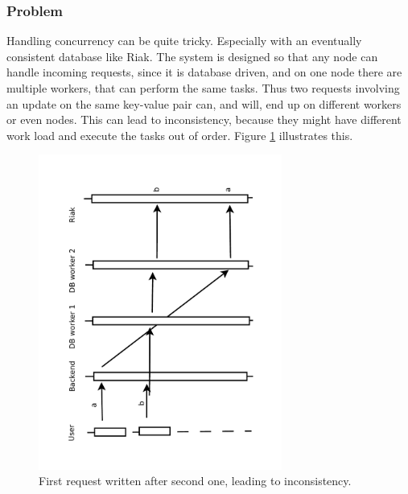 \documentclass[11pt,a4paper]{report}
\begin{document}
\subsubsection{Problem}
Handling concurrency can be quite tricky.
Especially with an eventually consistent database like Riak.
The system is designed so that any node can handle incoming requests,
since it is database driven, and on one node there are multiple workers,
that can perform the same tasks.
Thus two requests involving an update on the same key-value pair can, and will,
end up on different workers or even nodes.
This can lead to inconsistency, because they might have different work load
and execute the tasks out of order.
Figure \ref{fig:concurrency:problem_expl} illustrates this.
\begin{figure}[htbp!]
 \centering
 \includegraphics[width=8cm, angle=-90]{./graphics/Concurrency_-_Earlier_session_write_replace_later_session_write.pdf}
 \vspace{-1cm}
 \caption{First request written after second one, leading to inconsistency.}
 \label{fig:concurrency:problem_expl}
\end{figure}
\end{document}
